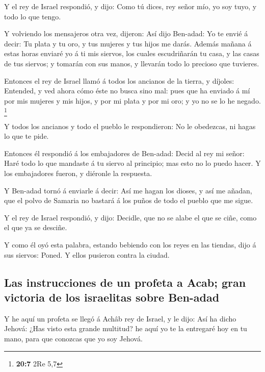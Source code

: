  Y el rey de Israel respondió, y dijo: Como tú dices, rey
señor mío, yo soy tuyo, y todo lo que tengo.

 Y volviendo los mensajeros otra vez, dijeron: Así dijo
Ben-adad: Yo te envié á decir: Tu plata y tu oro, y tus mujeres y tus
hijos me darás.  Además mañana á estas horas enviaré yo á
ti mis siervos, los cuales escudriñarán tu casa, y las casas de tus
siervos; y tomarán con sus manos, y llevarán todo lo precioso que
tuvieres.

 Entonces el rey de Israel llamó á todos los ancianos de
la tierra, y díjoles: Entended, y ved ahora cómo éste no busca sino mal:
pues que ha enviado á mí por mis mujeres y mis hijos, y por mi plata y
por mi oro; y yo no se lo he negado. \footnote{\textbf{20:7} 2Re 5,7}

 Y todos los ancianos y todo el pueblo le respondieron: No
le obedezcas, ni hagas lo que te pide.

 Entonces él respondió á los embajadores de Ben-adad:
Decid al rey mi señor: Haré todo lo que mandaste á tu siervo al
principio; mas esto no lo puedo hacer. Y los embajadores fueron, y
diéronle la respuesta.

 Y Ben-adad tornó á enviarle á decir: Así me hagan los
dioses, y así me añadan, que el polvo de Samaria no bastará á los puños
de todo el pueblo que me sigue.

 Y el rey de Israel respondió, y dijo: Decidle, que no se
alabe el que se ciñe, como el que ya se desciñe.

 Y como él oyó esta palabra, estando bebiendo con los
reyes en las tiendas, dijo á sus siervos: Poned. Y ellos pusieron contra
la ciudad.

\hypertarget{las-instrucciones-de-un-profeta-a-acab-gran-victoria-de-los-israelitas-sobre-ben-adad}{%
\subsection{Las instrucciones de un profeta a Acab; gran victoria de los
israelitas sobre
Ben-adad}\label{las-instrucciones-de-un-profeta-a-acab-gran-victoria-de-los-israelitas-sobre-ben-adad}}

 Y he aquí un profeta se llegó á Achâb rey de Israel, y
le dijo: Así ha dicho Jehová: ¿Has visto esta grande multitud? he aquí
yo te la entregaré hoy en tu mano, para que conozcas que yo soy Jehová.

